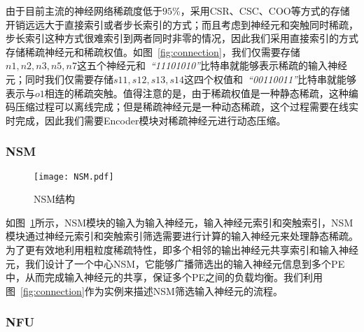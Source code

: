 由于目前主流的神经网络稀疏度低于$95\%$，采用CSR、CSC、COO等方式的存储开销远远大于直接索引或者步长索引的方式；而且考虑到神经元和突触同时稀疏，步长索引这种方式很难索引到两者同时非零的情况，因此我们采用直接索引的方式存储稀疏神经元和稀疏权值。如图~\ref{fig:connection}，我们仅需要存储$n1, n2, n3, n5, n7$这五个神经元和~\emph{“11101010”}比特串就能够表示稀疏的输入神经元；同时我们仅需要存储$s11, s12, s13, s14$这四个权值和~\emph{“00110011”}比特串就能够表示与$o1$相连的稀疏突触。值得注意的是，由于稀疏权值是一种静态稀疏，这种编码压缩过程可以离线完成；但是稀疏神经元是一种动态稀疏，这个过程需要在线实时完成，因此我们需要Encoder模块对稀疏神经元进行动态压缩。

\subsubsection{NSM}
\begin{figure}[h]
\centering
\texttt{[image: NSM.pdf]}
\caption{NSM结构}
\label{fig:NSM}
\end{figure}

如图~\ref{fig:NSM}所示，NSM模块的输入为输入神经元，输入神经元索引和突触索引，NSM模块通过神经元索引和突触索引筛选需要进行计算的输入神经元来处理静态稀疏。为了更有效地利用粗粒度稀疏特性，即多个相邻的输出神经元共享索引和输入神经元，我们设计了一个中心NSM，它能够广播筛选出的输入神经元信息到多个PE中，从而完成输入神经元的共享，保证多个PE之间的负载均衡。我们利用图~\ref{fig:connection}作为实例来描述NSM筛选输入神经元的流程。


\subsubsection{NFU}

